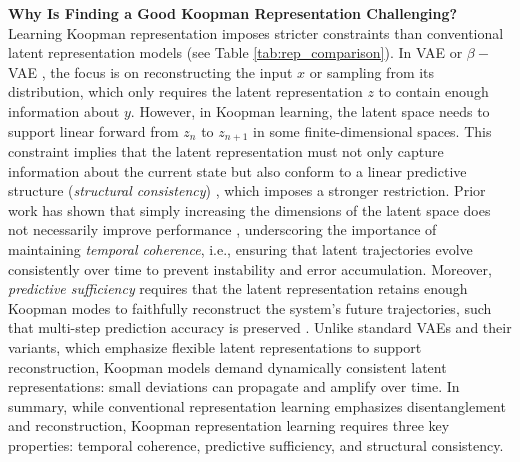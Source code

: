 \documentclass{article} %
\begin{document}
\textbf{Why Is Finding a Good Koopman Representation Challenging?} Learning Koopman representation imposes stricter constraints than conventional latent representation models (see Table \ref{tab:rep_comparison}). In VAE or $\beta-$VAE \citep{kingma2013auto, burgess2018understanding}, the focus is on reconstructing the input $x$ or sampling from its distribution, which only requires the latent representation $z$ to contain enough information about $y$. However, in Koopman learning, the latent space needs to support linear forward from $z_n$ to $z_{n+1}$ in some finite-dimensional spaces. 
This constraint implies that the latent representation must not only capture information about the current state but also conform to a linear predictive structure (\textit{structural consistency}) \citep{mardt2018vampnets, kostic2023sharp, kostic2023learning, kostic2024consistent}, which imposes a stronger restriction. Prior work has shown that simply increasing the dimensions of the latent space does not necessarily improve performance \citep{li2019learning, brunton2021modern}, underscoring the importance of maintaining \textit{temporal coherence}, i.e., ensuring that latent trajectories evolve consistently over time to prevent instability and error accumulation. Moreover, \textit{predictive sufficiency} requires that the latent representation retains enough Koopman modes to faithfully reconstruct the system’s future trajectories, such that multi-step prediction accuracy is preserved \citep{wang2022rethinking, wang2025rethinking}. Unlike standard VAEs and their variants, which emphasize flexible latent representations to support reconstruction, Koopman models demand dynamically consistent latent representations: small deviations can propagate and amplify over time. In summary, while conventional representation learning emphasizes disentanglement and reconstruction, Koopman representation learning requires three key properties: temporal coherence, predictive sufficiency, and structural consistency.
\end{document}
